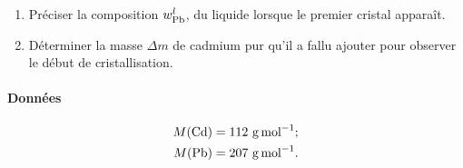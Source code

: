 \begin{enumerate}
\item Préciser la composition $w^l_{\ce{Pb}}$, du liquide lorsque le premier cristal apparaît.

\item Déterminer la masse $\Delta m$ de cadmium pur qu'il a fallu  ajouter pour observer le début de cristallisation.
\end{enumerate}

\paragraph*{Données} 
\begin{align*}
M ( \ce{Cd} ) &= 112 ~ \si{\gram\per\mole} ; \\
M ( \ce{Pb} ) &= 207 ~ \si{\gram\per\mole} .
\end{align*}
